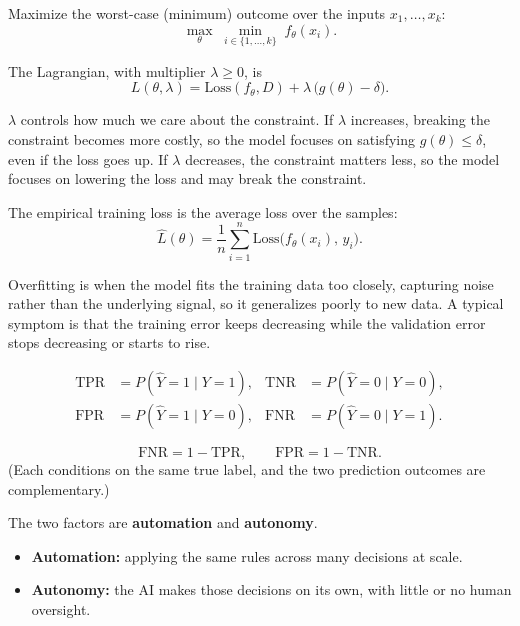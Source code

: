\documentclass{cisXXX} %
\begin{document}
\HWsubproblem
Maximize the worst-case (minimum) outcome over the inputs $x_1, \dots, x_k$:
$$\max_{\theta} \; \min_{i \in \{1,\dots,k\}} \; f_\theta(x_i).$$

\HWsubproblem
The Lagrangian, with multiplier $\lambda \ge 0$, is
$$L(\theta, \lambda) = \mathrm{Loss}(f_\theta, D) + \lambda\,\big(g(\theta) - \delta\big).$$

\HWsubproblem
$\lambda$ controls how much we care about the constraint. If $\lambda$ increases, breaking the constraint becomes more costly, so the model focuses on satisfying $g(\theta) \le \delta$, even if the loss goes up. If $\lambda$ decreases, the constraint matters less, so the model focuses on lowering the loss and may break the constraint.

\HWproblem
\HWsubproblem
The empirical training loss is the average loss over the samples:
$$\hat{L}(\theta) = \frac{1}{n} \sum_{i=1}^{n} \mathrm{Loss}\big(f_\theta(x_i),\, y_i\big).$$

\HWsubproblem
Overfitting is when the model fits the training data too closely, capturing noise rather than the underlying signal, so it generalizes poorly to new data. A typical symptom is that the training error keeps decreasing while the validation error stops decreasing or starts to rise.

\HWsubproblem
\begin{align*}
\mathrm{TPR} &= P(\hat{Y} = 1 \mid Y = 1), &
\mathrm{TNR} &= P(\hat{Y} = 0 \mid Y = 0), \\
\mathrm{FPR} &= P(\hat{Y} = 1 \mid Y = 0), &
\mathrm{FNR} &= P(\hat{Y} = 0 \mid Y = 1).
\end{align*}

\HWsubproblem
$$\mathrm{FNR} = 1 - \mathrm{TPR}, \qquad \mathrm{FPR} = 1 - \mathrm{TNR}.$$
(Each conditions on the same true label, and the two prediction outcomes are complementary.)

\HWproblem
\HWsubproblem
The two factors are \textbf{automation} and \textbf{autonomy}.
\begin{itemize}
\item \textbf{Automation:} applying the same rules across many decisions at scale.
\item \textbf{Autonomy:} the AI makes those decisions on its own, with little or no human oversight.
\end{itemize}
\end{document}
